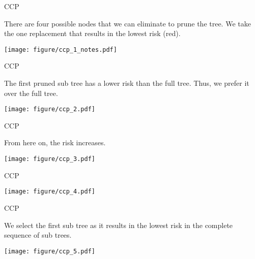 \documentclass[11pt,compress,t,notes=noshow, xcolor=table]{beamer}
\begin{document}
\begin{frame}[noframenumbering]{CCP}

There are four possible nodes that we can eliminate to prune the tree.
We take the one replacement that results in the lowest risk (red).

\vspace{0.25cm}

\color{fgcolor}

{\centering \texttt{[image: figure/ccp\_1\_notes.pdf]} 

}

\end{frame}

\begin{frame}[noframenumbering]{CCP}


The first pruned sub tree has a lower risk than the full tree.
Thus, we prefer it over the full tree.
\vspace{0.25cm}

{\centering \texttt{[image: figure/ccp\_2.pdf]} 

}

\end{frame}

\begin{frame}[noframenumbering]{CCP}

From here on, the risk increases.
\vspace{0.25cm}


{\centering \texttt{[image: figure/ccp\_3.pdf]} 

}

\end{frame}

\begin{frame}[noframenumbering]{CCP}


{\centering \texttt{[image: figure/ccp\_4.pdf]} 

}


\end{frame}

\begin{frame}[noframenumbering]{CCP}

We select the first sub tree as it results in the lowest risk in the complete sequence of sub trees.
\vspace{0.25cm}


{\centering \texttt{[image: figure/ccp\_5.pdf]} 

}


\end{frame}



\endlecture
\end{document}
